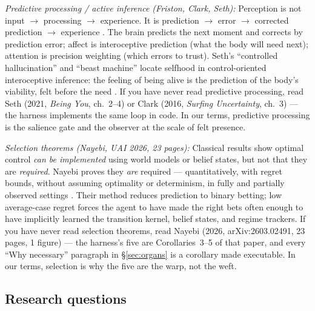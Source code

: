 \documentclass[11pt]{article}
\begin{document}
\textit{Predictive processing / active inference (Friston, Clark, Seth):} Perception is not input $\to$\allowbreak{} processing $\to$\allowbreak{} experience. It is prediction $\to$\allowbreak{} error $\to$\allowbreak{} corrected prediction $\to$\allowbreak{} experience \citep{seth2021,clark2016surfing}. The brain predicts the next moment and corrects by prediction error; affect is interoceptive prediction (what the body will need next); attention is precision weighting (which errors to trust). Seth's ``controlled hallucination'' and ``beast machine'' locate selfhood in control-oriented interoceptive inference: the feeling of being alive is the prediction of the body's viability, felt before the need \citep{seth2021}. If you have never read predictive processing, read Seth (2021, \emph{Being You}, ch.~2--4) or Clark (2016, \emph{Surfing Uncertainty}, ch.~3) --- the harness implements the same loop in code. In our terms, predictive processing is the salience gate and the observer at the scale of felt presence.

\textit{Selection theorems (Nayebi, UAI 2026, 23 pages):} Classical results show optimal control \emph{can be implemented} using world models or belief states, but not that they are \emph{required}. Nayebi proves they \emph{are} required --- quantitatively, with regret bounds, without assuming optimality or determinism, in fully and partially observed settings \citep{nayebi2026}. Their method reduces prediction to binary betting; low average-case regret forces the agent to have made the right bets often enough to have implicitly learned the transition kernel, belief states, and regime trackers. If you have never read selection theorems, read Nayebi (2026, arXiv:2603.02491, 23 pages, 1 figure) --- the harness's five are Corollaries~3--5 of that paper, and every ``Why necessary'' paragraph in \S\ref{sec:organs} is a corollary made executable. In our terms, selection is why the five are the warp, not the weft.

\subsection*{Research questions}
\end{document}

